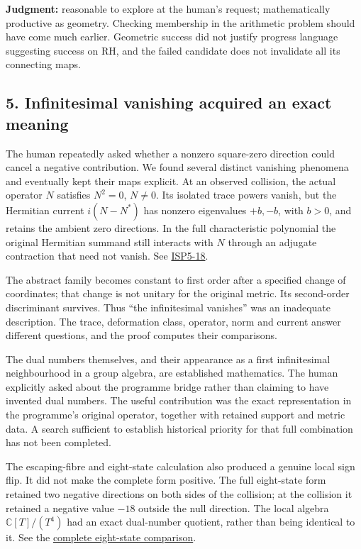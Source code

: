 \documentclass[
  british,
  11pt,
  a4paper,
]{article}
\begin{document}
\textbf{Judgment:} reasonable to explore at the human's request;
mathematically productive as geometry. Checking membership in the
arithmetic problem should have come much earlier. Geometric success did
not justify progress language suggesting success on RH, and the failed
candidate does not invalidate all its connecting maps.

\subsection{5. Infinitesimal vanishing acquired an exact
meaning}\label{infinitesimal-vanishing-acquired-an-exact-meaning}

The human repeatedly asked whether a nonzero square-zero direction could
cancel a negative contribution. We found several distinct vanishing
phenomena and eventually kept their maps explicit. At an observed
collision, the actual operator \(N\) satisfies \(N^2=0\), \(N\ne0\). Its
isolated trace powers vanish, but the Hermitian current \(i(N-N^*)\) has
nonzero eigenvalues \(+b,-b\), with \(b>0\), and retains the ambient
zero directions. In the full characteristic polynomial the original
Hermitian summand still interacts with \(N\) through an adjugate
contraction that need not vanish. See
\href{https://github.com/KokunoYumeto/zeta-function-research-reader/blob/173dbc6ed5a03235dbe7654f928f3692107db39b/workbenches/splitzero-tandem/branches/tau-zero-prime-positivity/INFINITESIMAL_SUPPORT_POSITIVITY_DERIVATION.md}{ISP5-18}.

The abstract family becomes constant to first order after a specified
change of coordinates; that change is not unitary for the original
metric. Its second-order discriminant survives. Thus ``the infinitesimal
vanishes'' was an inadequate description. The trace, deformation class,
operator, norm and current answer different questions, and the proof
computes their comparisons.

The dual numbers themselves, and their appearance as a first
infinitesimal neighbourhood in a group algebra, are established
mathematics. The human explicitly asked about the programme bridge
rather than claiming to have invented dual numbers. The useful
contribution was the exact representation in the programme's original
operator, together with retained support and metric data. A search
sufficient to establish historical priority for that full combination
has not been completed.

The escaping-fibre and eight-state calculation also produced a genuine
local sign flip. It did not make the complete form positive. The full
eight-state form retained two negative directions on both sides of the
collision; at the collision it retained a negative value \(-18\) outside
the null direction. The local algebra \(\mathbb C[T]/(T^4)\) had an
exact dual-number quotient, rather than being identical to it. See the
\href{https://github.com/KokunoYumeto/zeta-function-research-reader/blob/d5c9d198a8432e3ede468b280162a99c00e3f4f7/workbenches/splitzero-tandem/branches/tau-zero-prime-positivity/EIGHT_STATE_HEAT_COMPARISON.md}{complete
eight-state comparison}.
\end{document}

